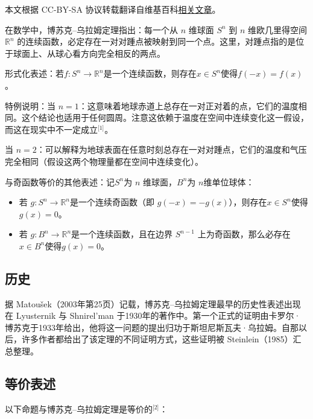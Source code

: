
本文根据 CC-BY-SA 协议转载翻译自维基百科\href{https://en.wikipedia.org/wiki/Borsuk\%E2\%80\%93Ulam_theorem}{相关文章}。

在数学中，博苏克–乌拉姆定理指出：每一个从 $n$ 维球面 $S^n$ 到 $n$ 维欧几里得空间 $\mathbb{R}^n$ 的连续函数，必定存在一对对踵点被映射到同一个点。这里，对踵点指的是位于球面上、从球心看方向完全相反的两点。

形式化表述：若$f: S^n \to \mathbb{R}^n$是一个连续函数，则存在$x \in S^n$使得$f(-x) = f(x)$。

特例说明：当 $ n = 1$：这意味着地球赤道上总存在一对正对着的点，它们的温度相同。这个结论也适用于任何圆周。注意这依赖于温度在空间中连续变化这一假设，而这在现实中不一定成立\(^\text{[1]}\)。

当 $ n = 2 $：可以解释为地球表面在任意时刻总存在一对对踵点，它们的温度和气压完全相同（假设这两个物理量都在空间中连续变化）。

与奇函数等价的其他表述：记$ S^n $为 $n$ 维球面，$ B^n $为 $n$维单位球体：
\begin{itemize}
\item 若  $g: S^n \to \mathbb{R}^n$是一个连续奇函数（即 $g(-x) = -g(x)$），则存在$x \in S^n$使得$g(x) = 0$。
\item 若 $g: B^n \to \mathbb{R}^n$是一个连续函数，且在边界 $S^{n-1}$ 上为奇函数，那么必存在$x \in B^n$使得$g(x) = 0$。
\end{itemize}
\subsection{历史}
据 Matoušek（2003年第25页）记载，博苏克–乌拉姆定理最早的历史性表述出现在 Lyusternik 与 Shnirel'man 于1930年的著作中。第一个正式的证明由卡罗尔·博苏克于1933年给出，他将这一问题的提出归功于斯坦尼斯瓦夫·乌拉姆。自那以后，许多作者都给出了该定理的不同证明方式，这些证明被 Steinlein（1985）汇总整理。
\subsection{等价表述}
以下命题与博苏克–乌拉姆定理是等价的\(^\text{[2]}\)：

